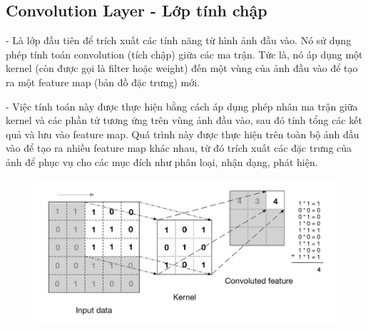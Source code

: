\documentclass[12pt, a4paper]{article}
\begin{document}
\subsection{Convolution Layer - Lớp tính chập}
\par \hspace{1cm}- Là lớp đầu tiên để trích xuất các tính năng từ hình ảnh đầu vào. Nó sử dụng phép tính  toán convolution (tích chập) giữa các ma trận. Tức là, nó áp dụng một kernel (còn được gọi là filter hoặc weight) đến một vùng của ảnh đầu vào để tạo ra một feature map (bản đồ đặc trưng) mới. 
\par \hspace{1cm}- Việc tính toán này được thực hiện bằng cách áp dụng phép nhân ma trận giữa kernel và các phần tử tương ứng trên vùng ảnh đầu vào, sau đó tính tổng các kết quả và lưu vào feature map. Quá trình này được thực hiện trên toàn bộ ảnh đầu vào để tạo ra nhiều feature map khác nhau, từ đó trích xuất các đặc trưng của ảnh để phục vụ cho các mục đích như phân loại, nhận dạng, phát hiện.
\begin{figure}[h] %
    \centering
    \includegraphics[scale = 0.6]{Img/ConvL2.png}
\end{figure}
\end{document}
